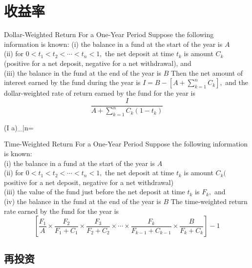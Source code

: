 \documentclass[cn,11pt,chinese,black]{elegantbook}
\begin{document}
\chapter{收益率}
\begin{definition}{Dollar-Weighted Return For a One-Year Period}
\noindent	Suppose the following information is known:
	(i) the balance in a fund at the start of the year is $A$ \\
	(ii) for $0<t_{1}<t_{2}<\cdots<t_{n}<1,$ the net deposit at time $t_{k}$ is amount $C_{k}$ (positive for a net deposit, negative for a net withdrawal), and \\
	(iii) the balance in the fund at the end of the year is $B$
	Then the net amount of interest earned by the fund during the year is $I=B-\left[A+\sum_{k=1}^{n} C_{k}\right],$ and the dollar-weighted rate of return earned by the fund for the year is
	\[
	\frac{I}{A+\sum_{k=1}^{n} C_{k}\left(1-t_{k}\right)}
	\]
\end{definition}
\begin{remark}
	(I a)_{\bar{n}}=
\end{remark}
\begin{definition}{Time-Weighted Return For a One-Year Period}
\noinent Suppose the following information is known:\\
	(i) the balance in a fund at the start of the year is $A$\\
	(ii) for $0<t_{1}<t_{2}<\cdots<t_{n}<1,$ the net deposit at time $t_{k}$ is amount $C_{k}($ positive for a net deposit, negative for a net withdrawal)\\
	(iii) the value of the fund just before the net deposit at time $t_{k}$ is $F_{k},$ and\\
	(iv) the balance in the fund at the end of the year is $B$
	The time-weighted return rate earned by the fund for the year is
	\[
	\left[\frac{F_{1}}{A} \times \frac{F_{2}}{F_{1}+C_{1}} \times \frac{F_{3}}{F_{2}+C_{2}} \times \cdots \times \frac{F_{k}}{F_{k-1}+C_{k-1}} \times \frac{B}{F_{k}+C_{k}}\right]-1
	\]	
\end{definition}	
\section{再投资}
\end{document}
